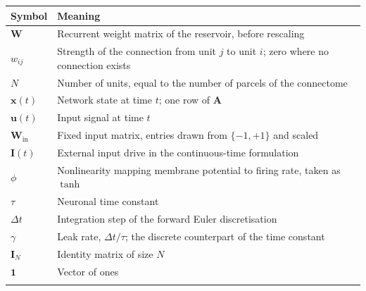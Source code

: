 \begin{longtable}{>{\raggedright\arraybackslash}p{3.4cm}p{\dimexpr\linewidth-3.4cm-4\tabcolsep\relax}}
    \toprule
    Symbol & Meaning \\
    \midrule\endhead

    $\mathbf{W}$ & Recurrent weight matrix of the reservoir, before rescaling \\
    $w_{ij}$ & Strength of the connection from unit $j$ to unit $i$; zero where no connection exists \\
    $N$ & Number of units, equal to the number of parcels of the connectome \\
    $\mathbf{x}(t)$ & Network state at time $t$; one row of $\mathbf{A}$ \\
    $\mathbf{u}(t)$ & Input signal at time $t$ \\
    $\mathbf{W}_{\!\mathrm{in}}$ & Fixed input matrix, entries drawn from $\{-1,+1\}$ and scaled \\
    $\mathbf{I}(t)$ & External input drive in the continuous-time formulation \\
    $\phi$ & Nonlinearity mapping membrane potential to firing rate, taken as $\tanh$ \\
    $\tau$ & Neuronal time constant \\
    $\Delta t$ & Integration step of the forward Euler discretisation \\
    $\gamma$ & Leak rate, $\Delta t / \tau$; the discrete counterpart of the time constant \\
    $\mathbf{I}_N$ & Identity matrix of size $N$ \\
    $\mathbf{1}$ & Vector of ones \\
    \addlinespace


\end{longtable}
